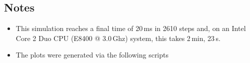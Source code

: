 \noindent
\topbar

\bottombar

\subsection{Notes}
\begin{itemize}
\item This simulation reaches a final time of 20\,ms in 2610 steps and,
      on an Intel Core 2 Duo CPU (E8400 @ 3.0\,Ghz) system, this takes 2\,min, 23\,s.
\item The plots were generated via the following scripts\\
      \topbarshort
      
      \bottombarshort\\
      \topbarshort
      
      \bottombarshort\\
      \topbarshort
      
      \bottombarshort
\end{itemize}
